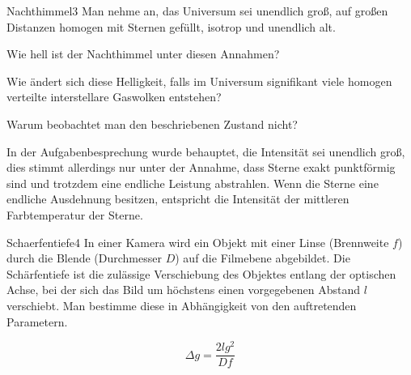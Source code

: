 


\begin{problem}{Nachthimmel}{3}
Man nehme an, das Universum sei unendlich groß, auf großen Distanzen homogen mit Sternen gefüllt, isotrop und unendlich alt.
\begin{abcenum}
\item Wie hell ist der Nachthimmel unter diesen Annahmen?
\item Wie ändert sich diese Helligkeit, falls im Universum signifikant viele homogen verteilte interstellare Gaswolken entstehen?
\item Warum beobachtet man den beschriebenen Zustand nicht?
\end{abcenum}
\begin{solution}
\begin{abcenum}
\item In der Aufgabenbesprechung wurde behauptet, die Intensität sei unendlich groß, dies stimmt allerdings nur unter der Annahme, dass Sterne exakt punktförmig sind und trotzdem eine endliche Leistung abstrahlen. Wenn die Sterne eine endliche Ausdehnung besitzen, entspricht die Intensität der mittleren Farbtemperatur der Sterne.
\end{abcenum}
\end{solution}
\end{problem}


\begin{problem}{Schaerfentiefe}{4}
In einer Kamera wird ein Objekt mit einer Linse (Brennweite $f$) durch die Blende (Durchmesser $D$) auf die Filmebene abgebildet. Die Schärfentiefe ist die zulässige Verschiebung des Objektes entlang der optischen Achse, bei der sich das Bild um höchstens einen vorgegebenen Abstand $l$ verschiebt. Man bestimme diese in Abhängigkeit von den auftretenden Parametern.

\begin{solution}
\[
\Delta g = \frac{2 l g^2}{D f}
\]
\end{solution}
\end{problem}


